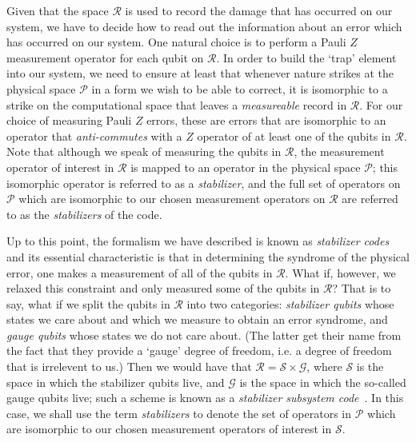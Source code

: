 \documentclass[twocolumn,showpacs,preprintnumbers,amsmath,amssymb,nofootinbib,pra,floatfix]{revtex4-1}
\begin{document}
Given that the space $\mathscr{R}$ is used to record the damage that has occurred on our system, we have to decide how to read out the information about an error which has occurred on our system.  One natural choice is to perform a Pauli $Z$ measurement operator for each qubit on $\mathscr{R}$.  In order to build the `trap' element into our system, we need to ensure at least that whenever nature strikes at the physical space $\mathscr{P}$ in a form we wish to be able to correct, it is isomorphic to a strike on the computational space that leaves a \emph{measureable} record in $\mathscr{R}$.  For our choice of measuring Pauli $Z$ errors, these are errors that are isomorphic to an operator that \emph{anti-commutes} with a $Z$ operator of at least one of the qubits in $\mathscr{R}$.  Note that although we speak of measuring the qubits in $\mathscr{R}$, the measurement operator of interest in $\mathscr{R}$ is mapped to an operator in the physical space $\mathscr{P}$; this isomorphic operator is referred to as a \emph{stabilizer}, and the full set of operators on $\mathscr{P}$ which are isomorphic to our chosen measurement operators on $\mathscr{R}$ are referred to as the \emph{stabilizers} of the code.

Up to this point, the formalism we have described is known as \emph{stabilizer codes}~\cite{Gottesman:96a,Gottesman:97a,Calderbank:97a,Calderbank:97b} and its essential characteristic is that in determining the syndrome of the physical error, one makes a measurement of all of the qubits in $\mathscr{R}$. What if, however, we relaxed this constraint and only measured some of the qubits in $\mathscr{R}$?  That is to say, what if we split the qubits in $\mathscr{R}$ into two categories: \emph{stabilizer
qubits} whose states we care about and which we measure to obtain an error syndrome, and \emph{gauge
qubits} whose states we do not care about.  (The latter get their name
from the fact that they provide a `gauge' degree of freedom, i.e. a
degree of freedom that is irrelevent to us.)  Then we would have that
$\mathscr{R}=\mathscr{S}\times \mathscr{G}$, where $\mathscr{S}$ is
the space in which the stabilizer qubits live, and $\mathscr{G}$ is
the space in which the so-called gauge qubits live; such a scheme is
known as a \emph{stabilizer subsystem code}~\cite{Poulin:05a}.  In this case, we shall use the term
\emph{stabilizers} to denote the set of operators in $\mathscr{P}$ which are isomorphic to our chosen measurement operators of interest in $\mathscr{S}$.
\end{document}
